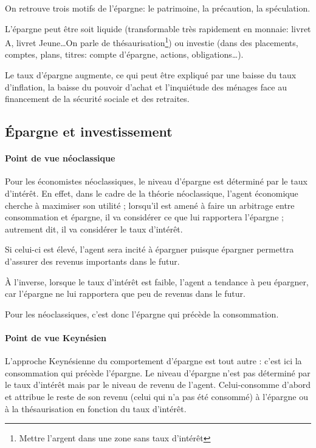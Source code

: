\documentclass[10pt,a4paper,french]{article}
\begin{document}
On retrouve trois motifs de l'épargne: le patrimoine, la précaution, la spéculation.

L'épargne peut être soit liquide (transformable très rapidement en monnaie: livret A, livret Jeune\ldots On parle de thésaurisation\footnote{Mettre l'argent dans une zone sans taux d'intérêt}) ou investie (dans des placements, comptes, plans, titres: compte d'épargne, actions, obligations\ldots).

Le taux d'épargne augmente, ce qui peut être expliqué par une baisse du taux d'inflation, la baisse du pouvoir d'achat et l'inquiétude des ménages face au financement de la sécurité sociale et des retraites.

\subsection{Épargne et investissement}

\paragraph{Point de vue néoclassique}
Pour les économistes néoclassiques, le niveau d'épargne est déterminé par le taux d'intérêt. En effet, dans
le cadre de la théorie néoclassique, l'agent économique cherche à maximiser son utilité ; lorsqu'il est amené à
faire un arbitrage entre consommation et épargne, il va considérer ce que lui rapportera l'épargne ;
autrement dit, il va considérer le taux d'intérêt.

Si celui-ci est élevé, l'agent sera incité à épargner puisque épargner permettra d'assurer des revenus
importants dans le futur.

À l'inverse, lorsque le taux d'intérêt est faible, l'agent a tendance à peu épargner, car l’épargne ne lui
rapportera que peu de revenus dans le futur.

Pour les néoclassiques, c'est donc l’épargne qui précède la consommation.

\paragraph{Point de vue Keynésien}
L'approche Keynésienne du comportement d'épargne est tout autre : c'est ici la consommation qui précède
l'épargne. Le niveau d'épargne n'est pas déterminé par le taux d'intérêt mais par le niveau de revenu de
l'agent. Celui-consomme d'abord et attribue le reste de son revenu (celui qui n'a pas été consommé) à
l'épargne ou à la thésaurisation en fonction du taux d'intérêt.
\end{document}
